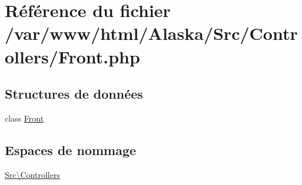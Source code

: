 \hypertarget{_front_8php}{}\section{Référence du fichier /var/www/html/\+Alaska/\+Src/\+Controllers/\+Front.php}
\label{_front_8php}
\subsection*{Structures de données}
\begin{DoxyCompactItemize}
\item 
class \hyperlink{class_src_1_1_controllers_1_1_front}{Front}
\end{DoxyCompactItemize}
\subsection*{Espaces de nommage}
\begin{DoxyCompactItemize}
\item 
 \hyperlink{namespace_src_1_1_controllers}{Src\textbackslash{}\+Controllers}
\end{DoxyCompactItemize}
